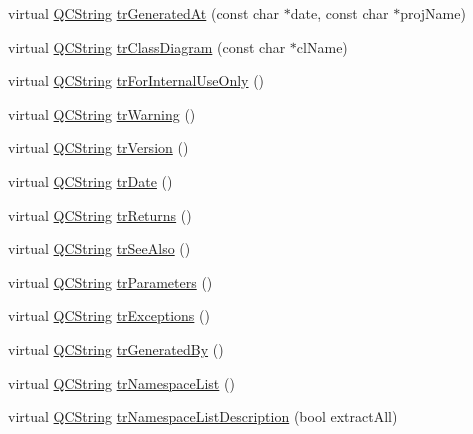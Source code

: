 \begin{DoxyCompactItemize}
\item 
virtual \mbox{\hyperlink{class_q_c_string}{Q\+C\+String}} \mbox{\hyperlink{class_translator_japanese_afe0d022e59f68b5cf2ad35faf6a863b4}{tr\+Generated\+At}} (const char $\ast$date, const char $\ast$proj\+Name)
\item 
virtual \mbox{\hyperlink{class_q_c_string}{Q\+C\+String}} \mbox{\hyperlink{class_translator_japanese_a61c23fa737e941bf024f7092369a6809}{tr\+Class\+Diagram}} (const char $\ast$cl\+Name)
\item 
virtual \mbox{\hyperlink{class_q_c_string}{Q\+C\+String}} \mbox{\hyperlink{class_translator_japanese_a2436d088680bf91099d64e05b07367b2}{tr\+For\+Internal\+Use\+Only}} ()
\item 
virtual \mbox{\hyperlink{class_q_c_string}{Q\+C\+String}} \mbox{\hyperlink{class_translator_japanese_a5e367bc6baa5dc916fa8633c65635301}{tr\+Warning}} ()
\item 
virtual \mbox{\hyperlink{class_q_c_string}{Q\+C\+String}} \mbox{\hyperlink{class_translator_japanese_abc86ceef2d5126c02e809ca52b1b029c}{tr\+Version}} ()
\item 
virtual \mbox{\hyperlink{class_q_c_string}{Q\+C\+String}} \mbox{\hyperlink{class_translator_japanese_a6d30bcc9994ff9850dd7cdb4892fcf85}{tr\+Date}} ()
\item 
virtual \mbox{\hyperlink{class_q_c_string}{Q\+C\+String}} \mbox{\hyperlink{class_translator_japanese_a9f333b1119ef3fc289221613e126f3d9}{tr\+Returns}} ()
\item 
virtual \mbox{\hyperlink{class_q_c_string}{Q\+C\+String}} \mbox{\hyperlink{class_translator_japanese_ac1153821b3168a86be43711ca22ec72b}{tr\+See\+Also}} ()
\item 
virtual \mbox{\hyperlink{class_q_c_string}{Q\+C\+String}} \mbox{\hyperlink{class_translator_japanese_a34997a683bc00a6b9b4410731af7ad08}{tr\+Parameters}} ()
\item 
virtual \mbox{\hyperlink{class_q_c_string}{Q\+C\+String}} \mbox{\hyperlink{class_translator_japanese_a740f03ad885ee604d5b0b94c43711f05}{tr\+Exceptions}} ()
\item 
virtual \mbox{\hyperlink{class_q_c_string}{Q\+C\+String}} \mbox{\hyperlink{class_translator_japanese_ab91e98e794a42802f4d9058c80a64478}{tr\+Generated\+By}} ()
\item 
virtual \mbox{\hyperlink{class_q_c_string}{Q\+C\+String}} \mbox{\hyperlink{class_translator_japanese_aeb30ffc6599808c003bdd5c270e81cb4}{tr\+Namespace\+List}} ()
\item 
virtual \mbox{\hyperlink{class_q_c_string}{Q\+C\+String}} \mbox{\hyperlink{class_translator_japanese_af5b31a9e3585f90971d5813c927f67ef}{tr\+Namespace\+List\+Description}} (bool extract\+All)

\end{DoxyCompactItemize}
